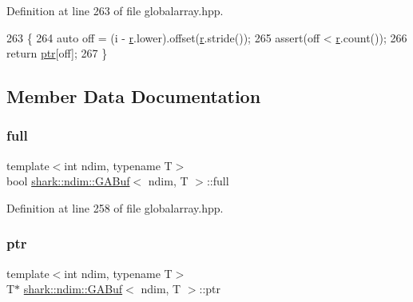 Definition at line 263 of file globalarray.\+hpp.


\begin{DoxyCode}
263                                                     \{
264                                 \textcolor{keyword}{auto} off = (i - \hyperlink{classshark_1_1ndim_1_1_g_a_buf_ad956cb661d537077c40362c8bc371ddf}{r}.lower).offset(\hyperlink{classshark_1_1ndim_1_1_g_a_buf_ad956cb661d537077c40362c8bc371ddf}{r}.stride());
265                                 assert(off < \hyperlink{classshark_1_1ndim_1_1_g_a_buf_ad956cb661d537077c40362c8bc371ddf}{r}.count());
266                                 \textcolor{keywordflow}{return} \hyperlink{classshark_1_1ndim_1_1_g_a_buf_a97b125250ee5edfc8c9f5c3663928421}{ptr}[off];
267                         \}
\end{DoxyCode}


\subsection{Member Data Documentation}
\hypertarget{classshark_1_1ndim_1_1_g_a_buf_ac5dd94b05ab78e812b0831dbb2651584}{}\label{classshark_1_1ndim_1_1_g_a_buf_ac5dd94b05ab78e812b0831dbb2651584} 
\subsubsection{\texorpdfstring{full}{full}}
{\footnotesize\ttfamily template$<$int ndim, typename T$>$ \\
bool \hyperlink{classshark_1_1ndim_1_1_g_a_buf}{shark\+::ndim\+::\+G\+A\+Buf}$<$ ndim, T $>$\+::full\hspace{0.3cm}{\ttfamily [mutable]}}



Definition at line 258 of file globalarray.\+hpp.

\hypertarget{classshark_1_1ndim_1_1_g_a_buf_a97b125250ee5edfc8c9f5c3663928421}{}\label{classshark_1_1ndim_1_1_g_a_buf_a97b125250ee5edfc8c9f5c3663928421} 
\subsubsection{\texorpdfstring{ptr}{ptr}}
{\footnotesize\ttfamily template$<$int ndim, typename T$>$ \\
T$\ast$ \hyperlink{classshark_1_1ndim_1_1_g_a_buf}{shark\+::ndim\+::\+G\+A\+Buf}$<$ ndim, T $>$\+::ptr}



